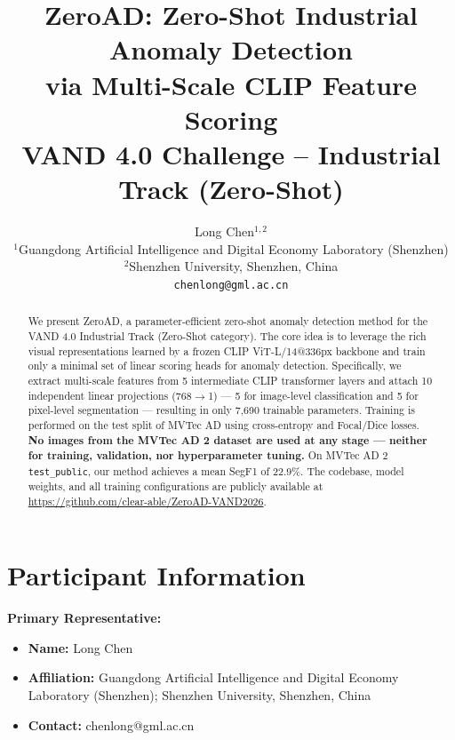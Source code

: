 \documentclass[10pt,twocolumn,letterpaper]{article}
\title{ZeroAD: Zero-Shot Industrial Anomaly Detection \\via Multi-Scale CLIP Feature Scoring \\
\large VAND 4.0 Challenge -- Industrial Track (Zero-Shot)}
\author{
Long Chen$^{1,2}$\\
$^{1}$Guangdong Artificial Intelligence and Digital Economy Laboratory (Shenzhen)\\
$^{2}$Shenzhen University, Shenzhen, China\\
{\tt\small chenlong@gml.ac.cn}
}
\begin{document}
\maketitle

\begin{abstract}
We present ZeroAD, a parameter-efficient zero-shot anomaly detection method for the VAND 4.0 Industrial Track (Zero-Shot category). The core idea is to leverage the rich visual representations learned by a frozen CLIP ViT-L/14@336px backbone and train only a minimal set of linear scoring heads for anomaly detection. Specifically, we extract multi-scale features from 5 intermediate CLIP transformer layers and attach 10 independent linear projections (768$\to$1) --- 5 for image-level classification and 5 for pixel-level segmentation --- resulting in only 7,690 trainable parameters. Training is performed on the test split of MVTec AD using cross-entropy and Focal/Dice losses. \textbf{No images from the MVTec AD 2 dataset are used at any stage --- neither for training, validation, nor hyperparameter tuning.} On MVTec AD 2 \texttt{test\_public}, our method achieves a mean SegF1 of 22.9\%. The codebase, model weights, and all training configurations are publicly available at \url{https://github.com/clear-able/ZeroAD-VAND2026}.
\end{abstract}

\section{Participant Information}

\noindent\textbf{Primary Representative:}
\begin{itemize}[leftmargin=*,nosep]
  \item \textbf{Name:} Long Chen
  \item \textbf{Affiliation:} Guangdong Artificial Intelligence and Digital Economy Laboratory (Shenzhen); Shenzhen University, Shenzhen, China
  \item \textbf{Contact:} chenlong@gml.ac.cn
\end{itemize}

\end{document}
